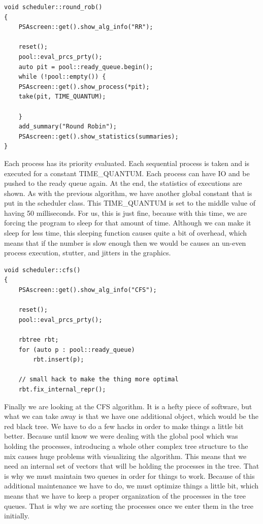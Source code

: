 \documentclass{article}
\begin{document}
\begin{lstlisting}
void scheduler::round_rob()
{
    PSAscreen::get().show_alg_info("RR");

    reset();
    pool::eval_prcs_prty();
    auto pit = pool::ready_queue.begin();
    while (!pool::empty()) {
	PSAscreen::get().show_process(*pit);
	take(pit, TIME_QUANTUM);

    }
    add_summary("Round Robin");
    PSAscreen::get().show_statistics(summaries);
}
\end{lstlisting}

Each process has its priority evaluated. Each sequential process is taken and is executed for a constant TIME\_QUANTUM. Each process can have IO and be pushed to the ready queue again. At the end, the statistics of executions are shown. As with the previous algorithm, we have another global constant that is put in the scheduler class. This TIME\_QUANTUM is set to the middle value of having 50 milliseconds. For us, this is just fine, because with this time, we are forcing the program to sleep for that amount of time. Although we can make it sleep for less time, this sleeping function causes quite a bit of overhead, which means that if the number is slow enough then we would be causes an un-even process execution, stutter, and jitters in the graphics.

\begin{lstlisting}
void scheduler::cfs()
{
    PSAscreen::get().show_alg_info("CFS");

    reset();
    pool::eval_prcs_prty();

    rbtree rbt;
    for (auto p : pool::ready_queue)
    	rbt.insert(p);

    // small hack to make the thing more optimal
    rbt.fix_internal_repr();
\end{lstlisting}

Finally we are looking at the CFS algorithm. It is a hefty piece of software, but what we can take away is that we have one additional object, which would be the red black tree. We have to do a few hacks in order to make things a little bit better. Because until know we were dealing with the global pool which was holding the processes, introducing a whole other complex tree structure to the mix causes huge problems with visualizing the algorithm. This means that we need an internal set of vectors that will be holding the processes in the tree. That is why we must maintain two queues in order for things to work. Because of this additional maintenance we have to do, we must optimize things a little bit, which means that we have to keep a proper organization of the processes in the tree queues. That is why we are sorting the processes once we enter them in the tree initially.
\end{document}
